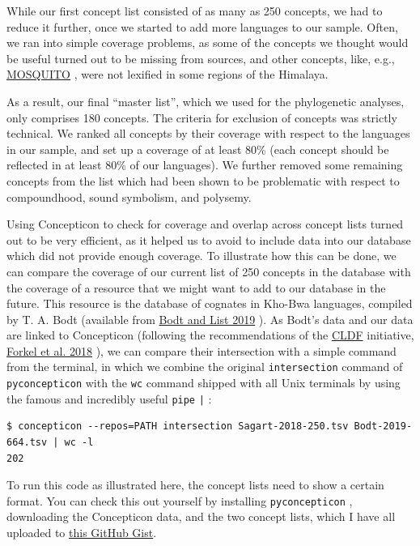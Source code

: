 \documentclass[
  a4paper,
  14pt,
  oneside,
  tablecaptionabove
]{scrbook}
\newcommand{\passthrough}[1]{#1}
\begin{document}
While our first concept list consisted of as many as 250 concepts, we
had to reduce it further, once we started to add more languages to our
sample. Often, we ran into simple coverage problems, as some of the
concepts we thought would be useful turned out to be missing from
sources, and other concepts, like, e.g.,
\href{https://concepticon.clld.org/parameters/1509}{MOSQUITO} , were not
lexified in some regions of the Himalaya.

As a result, our final \enquote{master list}, which we used for the
phylogenetic analyses, only comprises 180 concepts. The criteria for
exclusion of concepts was strictly technical. We ranked all concepts by
their coverage with respect to the languages in our sample, and set up a
coverage of at least 80\% (each concept should be reflected in at least
80\% of our languages). We further removed some remaining concepts from
the list which had been shown to be problematic with respect to
compoundhood, sound symbolism, and polysemy.

Using Concepticon to check for coverage and overlap across concept lists
turned out to be very efficient, as it helped us to avoid to include
data into our database which did not provide enough coverage. To
illustrate how this can be done, we can compare the coverage of our
current list of 250 concepts in the database with the coverage of a
resource that we might want to add to our database in the future. This
resource is the database of cognates in Kho-Bwa languages, compiled by
T. A. Bodt (available from
\href{http://bibliography.lingpy.org?key=Bodt2019}{Bodt and List 2019}
). As Bodt's data and our data are linked to Concepticon (following the
recommendations of the \href{https://cldf.clld.org}{CLDF} initiative,
\href{http://bibliography.lingpy.org?key=Forkel2018a}{Forkel et al.
2018} ), we can compare their intersection with a simple command from
the terminal, in which we combine the original
\passthrough{\lstinline!intersection!} command of
\passthrough{\lstinline!pyconcepticon!} with the
\passthrough{\lstinline!wc!} command shipped with all Unix terminals by
using the famous and incredibly useful \passthrough{\lstinline!pipe!}
\passthrough{\lstinline!|!} :

\begin{lstlisting}
$ concepticon --repos=PATH intersection Sagart-2018-250.tsv Bodt-2019-664.tsv | wc -l
202
\end{lstlisting}

To run this code as illustrated here, the concept lists need to show a
certain format. You can check this out yourself by installing
\passthrough{\lstinline!pyconcepticon!} , downloading the Concepticon
data, and the two concept lists, which I have all uploaded to
\href{https://gist.github.com/LinguList/fa93b0829fede0d6cbb01f4ca5f5b864}{this
GitHub Gist}.
\end{document}
